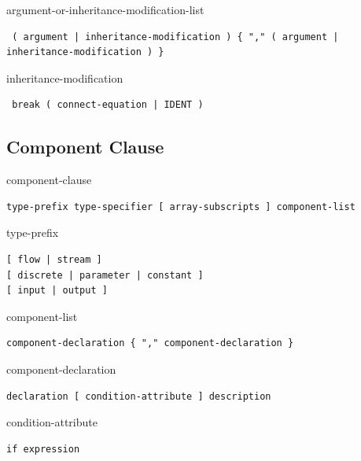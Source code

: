\begin{production}{argument-or-inheritance-modification-list}
\begin{lstlisting}
 ( argument | inheritance-modification ) { "," ( argument | inheritance-modification ) }
\end{lstlisting}
\end{production}

\begin{production}{inheritance-modification}
\begin{lstlisting}
 break ( connect-equation | IDENT )
\end{lstlisting}
\end{production}


\subsection{Component Clause}\label{component-clause}

\begin{production}{component-clause}
\begin{lstlisting}
type-prefix type-specifier [ array-subscripts ] component-list
\end{lstlisting}
\end{production}

\begin{production}{type-prefix}
\begin{lstlisting}
[ flow | stream ]
[ discrete | parameter | constant ]
[ input | output ]
\end{lstlisting}
\end{production}

\begin{production}{component-list}
\begin{lstlisting}
component-declaration { "," component-declaration }
\end{lstlisting}
\end{production}

\begin{production}{component-declaration}
\begin{lstlisting}
declaration [ condition-attribute ] description
\end{lstlisting}
\end{production}

\begin{production}{condition-attribute}
\begin{lstlisting}
if expression
\end{lstlisting}
\end{production}

